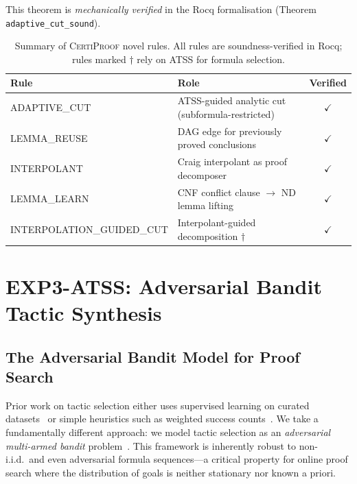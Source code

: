 \documentclass[acmtocl,review,anonymous]{acmart}
\newcommand{\CP}{\textsc{CertiProof}}
\newcommand{\ATSS}{\textsc{ATSS}}
\begin{document}
\noindent This theorem is \emph{mechanically verified} in the Rocq
formalisation (Theorem \texttt{adaptive\_cut\_sound}).

\begin{table}[t]
  \centering\footnotesize
  \caption{Summary of \CP{} novel rules.  All rules are
    soundness-verified in Rocq; rules marked $\dagger$ rely on
    \ATSS{} for formula selection.}
  \label{tab:novel-rules}
  \begin{tabular}{@{}l p{3.6cm} c@{}}
    \toprule
    Rule & Role & Verified \\
    \midrule
    ADAPTIVE\_CUT & \ATSS-guided analytic cut (subformula-restricted) & $\checkmark$ \\
    LEMMA\_REUSE & DAG edge for previously proved conclusions & $\checkmark$ \\
    INTERPOLANT & Craig interpolant as proof decomposer & $\checkmark$ \\
    LEMMA\_LEARN & CNF conflict clause $\to$ ND lemma lifting & $\checkmark$ \\
    INTERPOLATION\_GUIDED\_CUT & Interpolant-guided decomposition $\dagger$ & $\checkmark$ \\
    \bottomrule
  \end{tabular}
\end{table}

\section{EXP3-ATSS: Adversarial Bandit Tactic Synthesis}
\label{sec:atss}

\subsection{The Adversarial Bandit Model for Proof Search}

Prior work on tactic selection either uses supervised learning on
curated datasets~\cite{DeepSeekProver2024,SongYangAnandkumar2024} or
simple heuristics such as weighted success
counts~\cite{SekiyamaSuenaga2018}.  We take a fundamentally different
approach: we model tactic selection as an \emph{adversarial multi-armed
bandit} problem~\cite{AuerCesaBianchiFreundSchapire2002}. This
framework is inherently robust to non-i.i.d.\ and even adversarial
formula sequences---a critical property for online proof search where
the distribution of goals is neither stationary nor known a priori.
\end{document}

